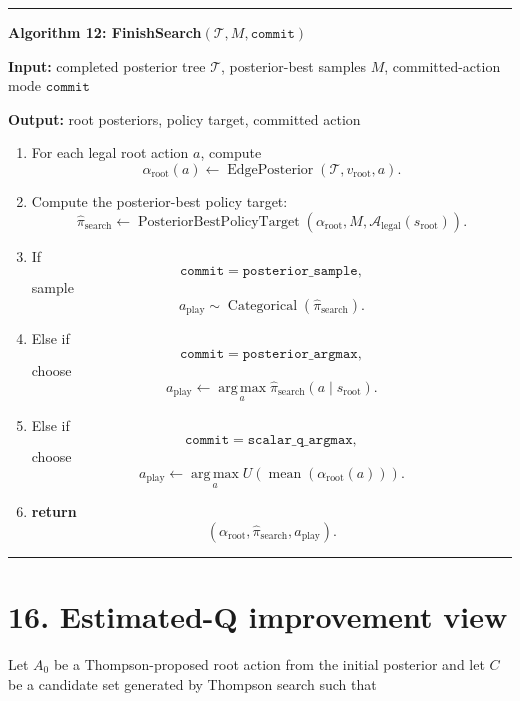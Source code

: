 \documentclass[11pt]{article}
\newcommand{\Cat}{\operatorname{Categorical}}
\newcommand{\argmax}{\operatorname*{arg\,max}}
\newcommand{\mean}{\operatorname{mean}}
\newcommand{\Tree}{\mathcal{T}}
\newcommand{\Legal}{\mathcal{A}_{\mathrm{legal}}}
\newcommand{\Utility}{U}
\newcommand{\EdgePosterior}{\operatorname{EdgePosterior}}
\newcommand{\PosteriorBestPolicyTarget}{\operatorname{PosteriorBestPolicyTarget}}
\newenvironment{algorithmblock}[1]
{
  \par\medskip
  \noindent\hrule\par\smallskip
  \noindent\textbf{#1}
  \par\smallskip
}
{
  \par\smallskip\noindent\hrule\par\medskip
}
\newcommand{\Input}{\textbf{Input: }}
\newcommand{\Output}{\textbf{Output: }}
\newcommand{\Return}{\textbf{return }}
\begin{document}
\begin{algorithmblock}{Algorithm 12: FinishSearch\((\Tree,M,\texttt{commit})\)}

\Input completed posterior tree \(\Tree\), posterior-best samples \(M\), committed-action mode \(\texttt{commit}\)

\Output root posteriors, policy target, committed action

\begin{enumerate}[leftmargin=2em]
  \item For each legal root action \(a\), compute
  \[
  \alpha_{\mathrm{root}}(a)
  \gets
  \EdgePosterior(\Tree,v_{\mathrm{root}},a).
  \]

  \item Compute the posterior-best policy target:
  \[
  \hat{\pi}_{\mathrm{search}}
  \gets
  \PosteriorBestPolicyTarget
  \left(
  \alpha_{\mathrm{root}},
  M,
  \Legal(s_{\mathrm{root}})
  \right).
  \]

  \item If
  \[
  \texttt{commit}=\texttt{posterior\_sample},
  \]
  sample
  \[
  a_{\mathrm{play}}
  \sim
  \Cat
  \left(
  \hat{\pi}_{\mathrm{search}}
  \right).
  \]

  \item Else if
  \[
  \texttt{commit}=\texttt{posterior\_argmax},
  \]
  choose
  \[
  a_{\mathrm{play}}
  \gets
  \argmax_a
  \hat{\pi}_{\mathrm{search}}(a\mid s_{\mathrm{root}}).
  \]

  \item Else if
  \[
  \texttt{commit}=\texttt{scalar\_q\_argmax},
  \]
  choose
  \[
  a_{\mathrm{play}}
  \gets
  \argmax_a
  \Utility
  \left(
  \mean
  \left(
  \alpha_{\mathrm{root}}(a)
  \right)
  \right).
  \]

  \item \Return
  \[
  \left(
  \alpha_{\mathrm{root}},
  \hat{\pi}_{\mathrm{search}},
  a_{\mathrm{play}}
  \right).
  \]
\end{enumerate}

\end{algorithmblock}

\section*{16. Estimated-Q improvement view}

Let \(A_0\) be a Thompson-proposed root action from the initial posterior and
let \(C\) be a candidate set generated by Thompson search such that
\end{document}
